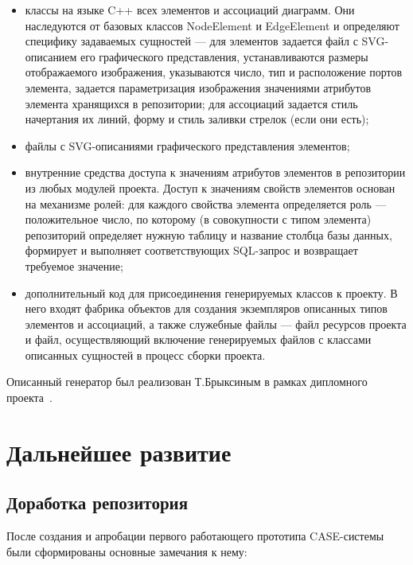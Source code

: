 \documentclass[a5paper]{article}
\begin{document}
\begin{itemize}
  \item классы на языке C++ всех элементов и
        ассоциаций диаграмм. Они наследуются от базовых классов
        NodeElement и EdgeElement и определяют специфику
        задаваемых сущностей --- для элементов задается файл с
        SVG-описанием его графического
        представления, устанавливаются размеры отображаемого изображения,
        указываются число, тип и расположение портов элемента, задается
        параметризация изображения значениями атрибутов элемента хранящихся в
        репозитории; для ассоциаций задается стиль начертания их линий, форму и
        стиль заливки стрелок (если они есть);
  \item файлы с SVG-описаниями графического представления элементов;
  \item внутренние средства доступа к значениям атрибутов элементов в
        репозитории из любых модулей проекта. Доступ к значениям свойств
        элементов основан на механизме ролей: для каждого свойства элемента
        определяется роль --- положительное число, по которому (в совокупности
        с типом элемента) репозиторий определяет нужную таблицу и название
        столбца базы данных, формирует и выполняет соответствующих
        SQL-запрос и возвращает требуемое значение;
  \item дополнительный код для присоединения генерируемых классов к проекту. В
        него входят фабрика объектов для создания экземпляров описанных типов
        элементов и ассоциаций, а также служебные файлы --- файл ресурсов проекта
        и файл, осуществляющий включение генерируемых файлов с классами
        описанных сущностей в процесс сборки проекта.
\end{itemize}

Описанный генератор был реализован Т.Брыксиным в рамках дипломного
проекта~\cite{bryksin}.

\section{Дальнейшее развитие}
\subsection{Доработка репозитория}

После создания и апробации первого работающего прототипа
CASE-системы были сформированы основные замечания к нему:
\end{document}
